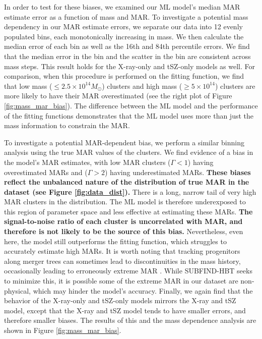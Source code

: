 \documentclass[twocolumn, linenumbers, 11pt]{aastex63}%
\begin{document}
In order to test for these biases, we examined our ML model's median MAR estimate error as a function of mass and MAR. To investigate a potential mass dependency in our MAR estimate errors, we separate our data into 12 evenly populated bins, each monotonically increasing in mass. We then calculate the median error of each bin as well as the 16th and 84th percentile errors. We find that the median error in the bin and the scatter in the bin are consistent across mass steps. This result holds for the X-ray-only and tSZ-only models as well. For comparison, when this procedure is performed on the fitting function, we find that low mass ($\leq2.5\times 10^{14} M_{\odot}$) clusters and high mass ($\geq 5\times10^{14}$) clusters are more likely to have their MAR overestimated (see the right plot of Figure \ref{fig:mass_mar_bias}). The difference between the ML model and the performance of the fitting functions demonstrates that the ML model uses more than just the mass information to constrain the MAR.

To investigate a potential MAR-dependent bias, we perform a similar binning analysis using the true MAR values of the clusters. We find evidence of a bias in the model's MAR estimates, with low MAR clusters ($\Gamma<1$) having overestimated MARs and ($\Gamma>2$) having underestimated MARs. \textbf{These biases reflect the unbalanced nature of the distribution of true MAR in the dataset (see Figure \ref{fig:data_dist}).} There is a long, narrow tail of very high MAR clusters in the distribution. The ML model is therefore underexposed to this region of parameter space and less effective at estimating these MARs. \textbf{The signal-to-noise ratio of each cluster is uncorrelated with MAR, and therefore is not likely to be the source of this bias.} Nevertheless, even here, the model still outperforms the fitting function, which struggles to accurately estimate high MARs. It is worth noting that tracking progenitors along merger trees can sometimes lead to discontinuities in the mass history, occasionally leading to erroneously extreme MAR \citep[][see discussion in section 6]{halo_finder_comp}. While SUBFIND-HBT seeks to minimize this, it is possible some of the extreme MAR in our dataset are non-physical, which may hinder the model's accuracy. Finally, we again find that the behavior of the X-ray-only and tSZ-only models mirrors the X-ray and tSZ model, except that the X-ray and tSZ model tends to have smaller errors, and therefore smaller biases. The results of this and the mass dependence analysis are shown in Figure \ref{fig:mass_mar_bias}.
\end{document}
